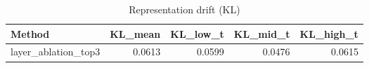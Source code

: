 \begin{table}[htbp]
\centering
\caption{Representation drift (KL)}
\label{tab:repr-drift}
\begin{tabular}{lrrrr}
\toprule
\textbf{Method} & \textbf{KL\_mean} & \textbf{KL\_low\_t} & \textbf{KL\_mid\_t} & \textbf{KL\_high\_t} \\
\midrule
layer\_ablation\_top3 & 0.0613 & 0.0599 & 0.0476 & 0.0615 \\
\bottomrule
\end{tabular}
\end{table}